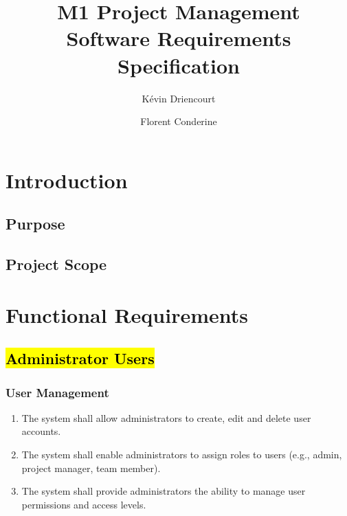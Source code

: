 \documentclass[]{article}
\title{\textbf{M1 Project Management} \\ \Large Software Requirements Specification}
\author{Kévin Driencourt \and Florent Conderine}
\begin{document}
    \maketitle

    \newpage

    \tableofcontents

    \newpage
    


    \section{Introduction}
        \subsection{Purpose}
        \subsection{Project Scope}



    \newpage



    \section{Functional Requirements}
        \subsection{\hl{Administrator Users}}
            \subsubsection{User Management}
            \begin{enumerate}[label=\scriptsize\textbf{\textcolor{gray}{FR-ADM-\arabic{adminCounter}}}, leftmargin=*, itemsep=-4px]
                \item The system shall allow administrators to create, edit and delete user accounts.
                \item The system shall enable administrators to assign roles to users (e.g., admin, project manager, team member).
                \item The system shall provide administrators the ability to manage user permissions and access levels.
            \end{enumerate}
\end{document}
